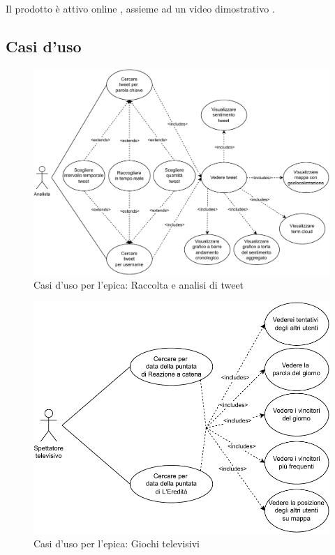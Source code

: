 \documentclass[11pt]{article}
\begin{document}
Il prodotto è attivo online \cite{deploy_prod}, assieme ad un video dimostrativo \cite{video}.


\subsection{Casi d'uso}
\begin{figure}[H]
    \centering
    \includegraphics[scale=0.7]{./img/usecase/tweet.pdf}
    \caption{Casi d'uso per l'epica: Raccolta e analisi di tweet}
\end{figure}

\begin{figure}[H]
    \centering
    \includegraphics[scale=0.7]{./img/usecase/tvgames.pdf}
    \caption{Casi d'uso per l'epica: Giochi televisivi}
\end{figure}
\end{document}
